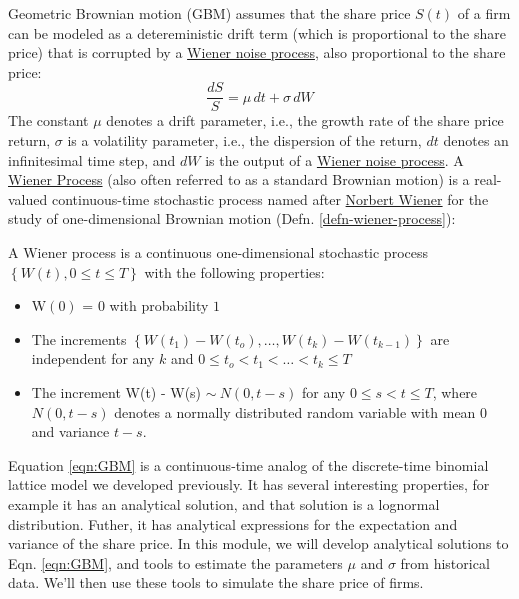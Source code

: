 \documentclass[11pt]{article}
\theoremstyle{definition}
\begin{document}
Geometric Brownian motion (GBM) assumes that the share price $S(t)$ of a firm can be modeled as a detereministic
drift term (which is proportional to the share price) that is corrupted by a \href{https://en.wikipedia.org/wiki/Wiener_process}{Wiener noise process}, also proportional to the share price:
\begin{equation}\label{eqn:GBM}
\frac{dS}{S} = {\mu}\,dt + \sigma\,{dW}
\end{equation}
The constant $\mu$ denotes a drift parameter, i.e., the growth rate of the share price return, $\sigma$ is a volatility parameter, i.e., 
the dispersion of the return, $dt$ denotes an infinitesimal time step, and $dW$ is the output of a 
\href{https://en.wikipedia.org/wiki/Wiener_process}{Wiener noise process}.  A \href{https://en.wikipedia.org/wiki/Wiener_process)}{Wiener Process} 
(also often referred to as a standard Brownian motion) is a real-valued continuous-time stochastic 
process named after \href{https://en.wikipedia.org/wiki/Norbert_Wiener}{Norbert Wiener} for the study of one-dimensional Brownian motion (Defn. \ref{defn-wiener-process}):
\begin{definition}\label{defn-wiener-process}
A Wiener process is a continuous one-dimensional stochastic process $\left\{W\left(t\right), 0\leq{t}\leq{T}\right\}$ with the following properties:
\begin{itemize}
\setlength\itemsep{0em}
\item{W$\left(0\right)$ = $0$ with probability $1$}
\item{The increments $\left\{W(t_{1}) - W(t_{o}),\dots, W(t_{k}) - W(t_{k-1})\right\}$ are independent for any $k$ and $0\leq{t_{o}}< t_{1} < \dots < t_{k} \leq{T}$}
\item{The increment W(t) - W(s) $\sim~N\left(0,t-s\right)$ for any $0\leq{s}< t \leq{T}$, where $N\left(0,t-s\right)$ denotes a normally distributed random variable with mean $0$ and variance $t - s$.}
\end{itemize}
\end{definition}
Equation \ref{eqn:GBM} is a continuous-time analog of the discrete-time binomial lattice model we developed previously. 
It has several interesting properties, for example it has an analytical solution, and that solution is a lognormal distribution.
Futher, it has analytical expressions for the expectation and variance of the share price.
In this module, we will develop analytical solutions to Eqn. \ref{eqn:GBM}, and tools to estimate 
the parameters $\mu$ and $\sigma$ from historical data. We'll then use these tools to simulate the share price of firms.
\end{document}
